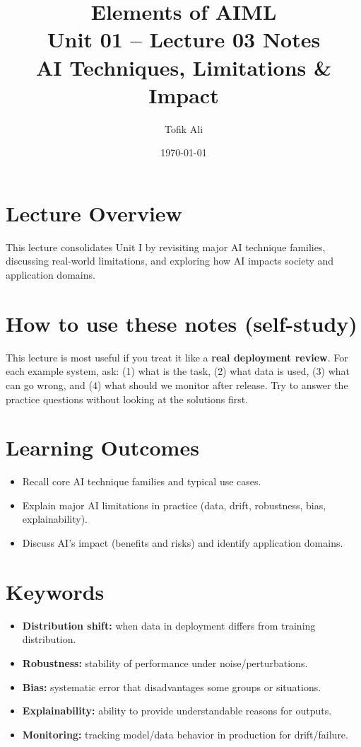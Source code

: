 \documentclass[11pt]{article}
\title{Elements of AIML\\Unit 01 -- Lecture 03 Notes\\AI Techniques, Limitations \& Impact}
\author{Tofik Ali}
\date{\today}
\begin{document}
\maketitle
\tableofcontents

\section{Lecture Overview}
This lecture consolidates Unit I by revisiting major AI technique families, discussing real-world limitations, and exploring how AI impacts society and application domains.
\notesources{\AIMLUnitISources}

\section{How to use these notes (self-study)}
This lecture is most useful if you treat it like a \textbf{real deployment review}.
For each example system, ask: (1) what is the task, (2) what data is used, (3) what can go wrong, and (4) what should we monitor after release.
Try to answer the practice questions without looking at the solutions first.

\section{Learning Outcomes}
\begin{itemize}[leftmargin=*]
  \item Recall core AI technique families and typical use cases.
  \item Explain major AI limitations in practice (data, drift, robustness, bias, explainability).
  \item Discuss AI's impact (benefits and risks) and identify application domains.
\end{itemize}

\section{Keywords}
\begin{itemize}[leftmargin=*]
  \item \textbf{Distribution shift:} when data in deployment differs from training distribution.
  \item \textbf{Robustness:} stability of performance under noise/perturbations.
  \item \textbf{Bias:} systematic error that disadvantages some groups or situations.
  \item \textbf{Explainability:} ability to provide understandable reasons for outputs.
  \item \textbf{Monitoring:} tracking model/data behavior in production for drift/failure.
\end{itemize}
\end{document}
